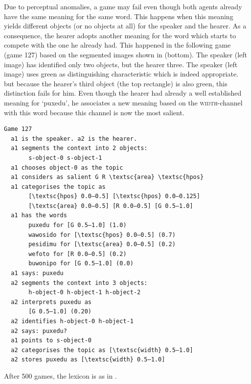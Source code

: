 Due to perceptual anomalies, a game may fail even though 
both agents already have the same meaning for the 
same word. This happens when this meaning yields different 
objects (or no objects at all) for the speaker and the hearer. 
As a consequence, the hearer adopts another meaning for 
the word which starts to compete with the one he already had. 
This happened in the following game (game 127)
based on the segmented images shown in  (bottom). The speaker (left image) has identified
only two objects, but the hearer three. The 
speaker (left image) uses green as distinguishing 
characteristic which is indeed appropriate. but 
because the hearer's third object (the top rectangle) is 
also green, this distinction fails for him.  
Even though the hearer had already a well established
meaning for `puxedu', he associates a new meaning 
based on the \textsc{width}-channel with this word because this 
channel is now the most salient. 
\begin{verbatim}
Game 127
  a1 is the speaker. a2 is the hearer. 
  a1 segments the context into 2 objects: 
       s-object-0 s-object-1
  a1 chooses object-0 as the topic 
  a1 considers as salient G R \textsc{area} \textsc{hpos} 
  a1 categorises the topic as 
       [\textsc{hpos} 0.0–0.5] [\textsc{hpos} 0.0–0.125]
       [\textsc{area} 0.0–0.5] [R 0.0–0.5] [G 0.5–1.0]
  a1 has the words
       puxedu for [G 0.5–1.0] (1.0)
       wawosido for [\textsc{hpos} 0.0–0.5] (0.7)
       pesidimu for [\textsc{area} 0.0–0.5] (0.2)
       wefoto for [R 0.0–0.5] (0.2)
       buwonipo for [G 0.5–1.0] (0.0)
  a1 says: puxedu
  a2 segments the context into 3 objects: 
       h-object-0 h-object-1 h-object-2
  a2 interprets puxedu as
       [G 0.5–1.0] (0.20)
  a2 identifies h-object-0 h-object-1
  a2 says: puxedu?
  a1 points to s-object-0
  a2 categorises the topic as [\textsc{width} 0.5–1.0]
  a2 stores puxedu as [\textsc{width} 0.5–1.0]
\end{verbatim}

After 500 games, the lexicon is as in . 

